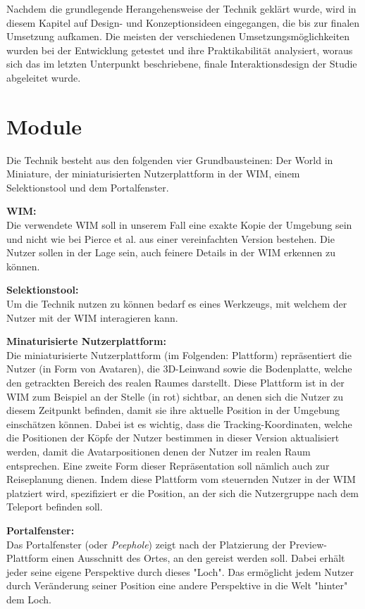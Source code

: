 Nachdem die grundlegende Herangehensweise der Technik geklärt wurde, wird in diesem Kapitel auf Design- und Konzeptionsideen eingegangen, die bis zur finalen Umsetzung aufkamen. Die meisten der verschiedenen Umsetzungsmöglichkeiten wurden bei der Entwicklung getestet und ihre Praktikabilität analysiert, woraus sich das im letzten Unterpunkt beschriebene, finale Interaktionsdesign der Studie abgeleitet wurde.

\section{Module}
Die Technik besteht aus den folgenden vier Grundbausteinen: Der World in Miniature, der miniaturisierten Nutzerplattform in der WIM, einem Selektionstool und dem Portalfenster.

\textbf{WIM:}\\
Die verwendete WIM soll in unserem Fall eine exakte Kopie der Umgebung sein und nicht wie bei Pierce et al. aus einer vereinfachten Version bestehen. Die Nutzer sollen in der Lage sein, auch feinere Details in der WIM erkennen zu können. 

 \textbf{Selektionstool:}\\
Um die Technik nutzen zu können bedarf es eines Werkzeugs, mit welchem der Nutzer mit der WIM interagieren kann. 



\textbf{Minaturisierte Nutzerplattform:}\\
Die miniaturisierte Nutzerplattform (im Folgenden: Plattform) repräsentiert die Nutzer (in Form von Avataren), die 3D-Leinwand sowie die Bodenplatte, welche den getrackten Bereich des realen Raumes darstellt. Diese Plattform ist in der WIM zum Beispiel an der Stelle (in rot) sichtbar, an denen sich die Nutzer zu diesem Zeitpunkt befinden, damit sie ihre aktuelle Position in der Umgebung einschätzen können. Dabei ist es wichtig, dass die Tracking-Koordinaten, welche die Positionen der Köpfe der Nutzer bestimmen in dieser Version aktualisiert werden, damit die Avatarpositionen denen der Nutzer im realen Raum entsprechen. Eine zweite Form dieser Repräsentation soll nämlich auch zur Reiseplanung dienen. Indem diese Plattform vom steuernden Nutzer in der WIM platziert wird, spezifiziert er die Position, an der sich die Nutzergruppe nach dem Teleport befinden soll.

\textbf{Portalfenster:}\\
Das Portalfenster (oder \textit{Peephole}) zeigt nach der Platzierung der Preview-Plattform einen Ausschnitt des Ortes, an den gereist werden soll. Dabei erhält jeder seine eigene Perspektive durch dieses "Loch". Das ermöglicht jedem Nutzer durch Veränderung seiner Position eine andere Perspektive in die Welt "hinter" dem Loch.

